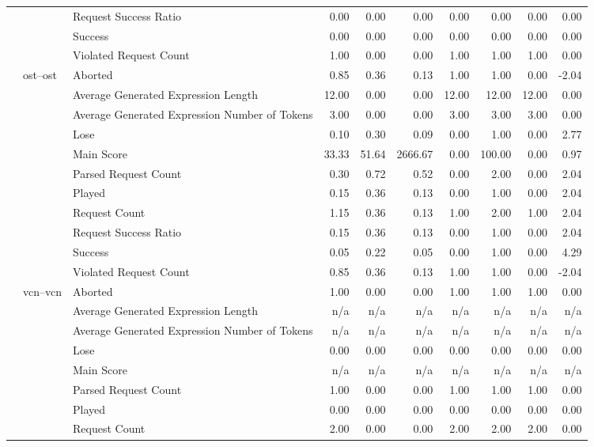 \begin{tabular}{lllrrrrrrr}
 &  & Request Success Ratio & 0.00 & 0.00 & 0.00 & 0.00 & 0.00 & 0.00 & 0.00 \\
 &  & Success & 0.00 & 0.00 & 0.00 & 0.00 & 0.00 & 0.00 & 0.00 \\
 &  & Violated Request Count & 1.00 & 0.00 & 0.00 & 1.00 & 1.00 & 1.00 & 0.00 \\
\cline{2-10}
 & \multirow[t]{11}{*}{ost--ost} & Aborted & 0.85 & 0.36 & 0.13 & 1.00 & 1.00 & 0.00 & -2.04 \\
 &  & Average Generated Expression Length & 12.00 & 0.00 & 0.00 & 12.00 & 12.00 & 12.00 & 0.00 \\
 &  & Average Generated Expression Number of Tokens & 3.00 & 0.00 & 0.00 & 3.00 & 3.00 & 3.00 & 0.00 \\
 &  & Lose & 0.10 & 0.30 & 0.09 & 0.00 & 1.00 & 0.00 & 2.77 \\
 &  & Main Score & 33.33 & 51.64 & 2666.67 & 0.00 & 100.00 & 0.00 & 0.97 \\
 &  & Parsed Request Count & 0.30 & 0.72 & 0.52 & 0.00 & 2.00 & 0.00 & 2.04 \\
 &  & Played & 0.15 & 0.36 & 0.13 & 0.00 & 1.00 & 0.00 & 2.04 \\
 &  & Request Count & 1.15 & 0.36 & 0.13 & 1.00 & 2.00 & 1.00 & 2.04 \\
 &  & Request Success Ratio & 0.15 & 0.36 & 0.13 & 0.00 & 1.00 & 0.00 & 2.04 \\
 &  & Success & 0.05 & 0.22 & 0.05 & 0.00 & 1.00 & 0.00 & 4.29 \\
 &  & Violated Request Count & 0.85 & 0.36 & 0.13 & 1.00 & 1.00 & 0.00 & -2.04 \\
\cline{2-10}
 & \multirow[t]{11}{*}{vcn--vcn} & Aborted & 1.00 & 0.00 & 0.00 & 1.00 & 1.00 & 1.00 & 0.00 \\
 &  & Average Generated Expression Length & n/a & n/a & n/a & n/a & n/a & n/a & n/a \\
 &  & Average Generated Expression Number of Tokens & n/a & n/a & n/a & n/a & n/a & n/a & n/a \\
 &  & Lose & 0.00 & 0.00 & 0.00 & 0.00 & 0.00 & 0.00 & 0.00 \\
 &  & Main Score & n/a & n/a & n/a & n/a & n/a & n/a & n/a \\
 &  & Parsed Request Count & 1.00 & 0.00 & 0.00 & 1.00 & 1.00 & 1.00 & 0.00 \\
 &  & Played & 0.00 & 0.00 & 0.00 & 0.00 & 0.00 & 0.00 & 0.00 \\
 &  & Request Count & 2.00 & 0.00 & 0.00 & 2.00 & 2.00 & 2.00 & 0.00 \\

\end{tabular}
